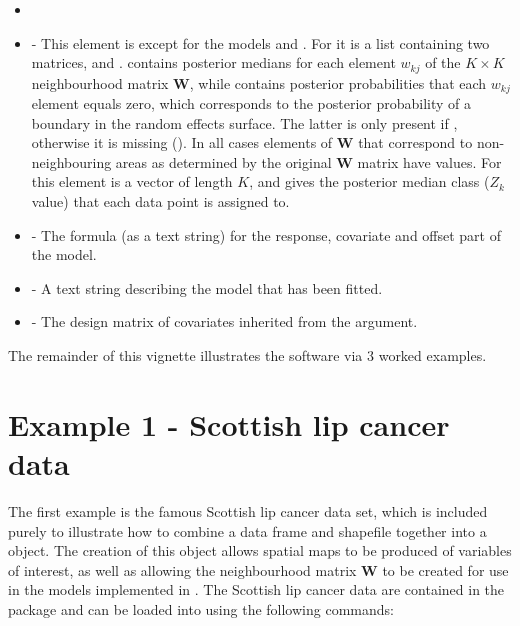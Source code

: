 \documentclass[article,shortnames,nojss]{jss}
\begin{document}
\begin{itemize}
\item {}

\item {} - This element is  except for the models  and . For  it is a list containing two matrices,  and .  contains posterior medians for each element $w_{kj}$ of the $K \times K$ neighbourhood matrix $\mathbf{W}$, while  contains posterior probabilities that each $w_{kj}$ element equals zero, which corresponds to the posterior probability of a boundary in the random effects surface. The latter is only present if , otherwise it is missing (). In all cases elements of $\mathbf{W}$ that correspond to non-neighbouring areas as determined by the original $\mathbf{W}$ matrix have  values.  For  this element is a vector of length $K$, and gives the posterior median class ($Z_{k}$ value) that each data point is assigned to.
        
\item {} - The formula (as a text string) for the response, covariate and offset part of the model.

\item {}- A text string describing the model that has been fitted.

\item {} - The design matrix of covariates inherited from the  argument.
\end{itemize}



The remainder of this vignette illustrates the  software via 3 worked examples.




\section{Example 1 - Scottish lip cancer data}
The first example is the famous Scottish lip cancer data set, which is included purely to illustrate how to combine a data frame and shapefile together into a  object. The creation of this object allows spatial maps to be produced of variables of interest, as well as allowing the neighbourhood matrix $\mathbf{W}$ to be created for use in the models implemented in . The Scottish lip cancer data are contained in the  package and can be loaded into  using the following commands:
\end{document}
